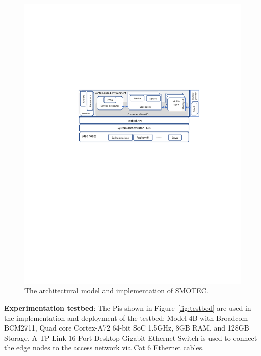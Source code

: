 \documentclass[conference]{IEEEtran}
\begin{document}
\begin{figure}[!htb]
\centering
\includegraphics[clip, trim=5.4cm 14.1cm 3.8cm 8.6cm, width=\columnwidth]{figures/arch2.pdf}
\caption{The architectural model and implementation of SMOTEC.}
\label{fig:arch}
\end{figure}

\noindent \textbf{Experimentation testbed}: The Pis shown in Figure~\ref{fig:testbed} are used in the implementation and deployment of the testbed: Model 4B with Broadcom BCM2711, Quad core Cortex-A72 64-bit SoC 1.5GHz, 8GB RAM, and 128GB Storage. A TP-Link 16-Port Desktop Gigabit Ethernet Switch is used to connect the edge nodes to the access network via Cat 6 Ethernet cables.
\end{document}
